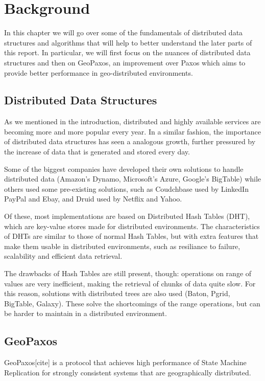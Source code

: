 \chapter{Background}\label{sec:Background}
In this chapter we will go over some of the fundamentals of distributed data structures and algorithms that will help to better understand the later parts of this report. In particular, we will first focus on the nuances of distributed data structures and then on  GeoPaxos, an improvement over Paxos which aims to provide better performance in geo-distributed environments.

\section{Distributed Data Structures}\label{sec:distributed-data-structures}
As we mentioned in the introduction, distributed and highly available services are becoming more and more popular every year. In a similar fashion, the importance of distributed data structures has seen a analogous growth, further pressured by the increase of data that is generated and stored every day. 

Some of the biggest companies have developed their own solutions to handle distributed data (Amazon's Dynamo, Microsoft's Azure, Google's BigTable) while others used some pre-existing solutions, such as Coudchbase used by LinkedIn PayPal and Ebay, and Druid used by Netflix and Yahoo.

Of these, most implementations are based on Distributed Hash Tables (DHT), which are key-value stores made for distributed environments.
The characteristics of DHTs are similar to those of normal Hash Tables, but with extra features that make them usable in distributed environments, such as resiliance to failure, scalability and efficient data retrieval.

The drawbacks of Hash Tables are still present, though: operations on range of values are very inefficient, making the retrieval of chunks of data quite slow. For this reason, solutions with distributed trees are also used (Baton, Pgrid, BigTable, Galaxy). These solve the shortcomings of the range operations, but can be harder to maintain in a distributed environment.

\section{GeoPaxos}\label{sec:GeoPaxos}
GeoPaxos[cite] is a protocol that achieves high performance of State Machine Replication for strongly consistent systems that are geographically distributed. 


